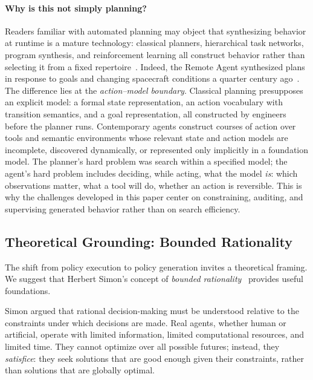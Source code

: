 \documentclass[11pt]{article}
\begin{document}
\paragraph{Why is this not simply planning?} Readers familiar with automated planning may object that synthesizing behavior at runtime is a mature technology: classical planners, hierarchical task networks, program synthesis, and reinforcement learning all construct behavior rather than selecting it from a fixed repertoire~\cite{ghallab_planning,gulwani_synthesis}. Indeed, the Remote Agent synthesized plans in response to goals and changing spacecraft conditions a quarter century ago~\cite{muscettola_remote_agent}. The difference lies at the \textit{action--model boundary}. Classical planning presupposes an explicit model: a formal state representation, an action vocabulary with transition semantics, and a goal representation, all constructed by engineers before the planner runs. Contemporary agents construct courses of action over tools and semantic environments whose relevant state and action models are incomplete, discovered dynamically, or represented only implicitly in a foundation model. The planner's hard problem was search within a specified model; the agent's hard problem includes deciding, while acting, what the model \textit{is}: which observations matter, what a tool will do, whether an action is reversible. This is why the challenges developed in this paper center on constraining, auditing, and supervising generated behavior rather than on search efficiency.

\subsection{Theoretical Grounding: Bounded Rationality}
\label{sec:bounded}

The shift from policy execution to policy generation invites a theoretical framing. We suggest that Herbert Simon's concept of \textit{bounded rationality}~\cite{simon_bounded} provides useful foundations.

Simon argued that rational decision-making must be understood relative to the constraints under which decisions are made. Real agents, whether human or artificial, operate with limited information, limited computational resources, and limited time. They cannot optimize over all possible futures; instead, they \textit{satisfice}: they seek solutions that are good enough given their constraints, rather than solutions that are globally optimal.
\end{document}
